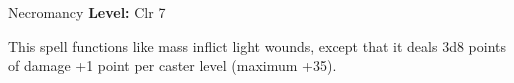 {Necromancy}
{
	\textbf{Level:}
	Clr 7\\
}
{
	This spell functions like mass inflict light wounds, except that it deals 3d8 points of damage +1 point per caster level (maximum +35).

}
